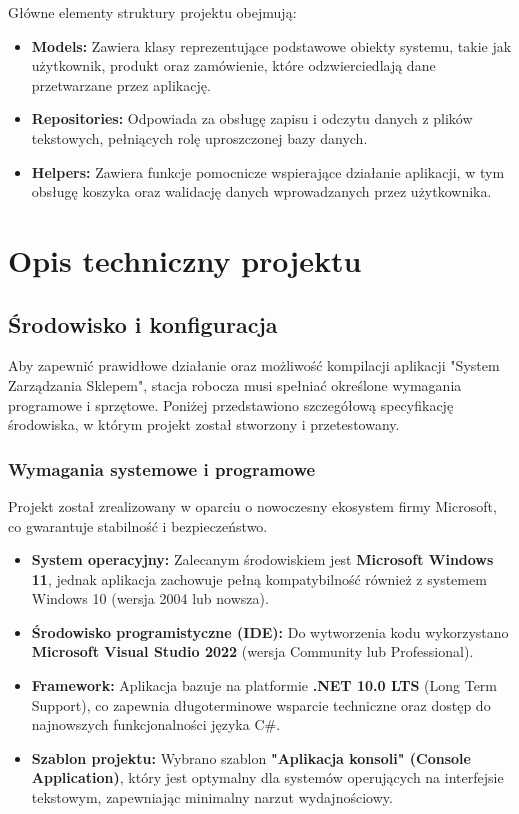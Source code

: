 \documentclass[a4paper,12pt]{report}
\begin{document}
Główne elementy struktury projektu obejmują:
\begin{itemize}
    \item \textbf{Models:} Zawiera klasy reprezentujące podstawowe obiekty systemu, takie jak użytkownik, produkt oraz zamówienie, które odzwierciedlają dane przetwarzane przez aplikację.
    \item \textbf{Repositories:} Odpowiada za obsługę zapisu i odczytu danych z plików tekstowych, pełniących rolę uproszczonej bazy danych.
    \item \textbf{Helpers:} Zawiera funkcje pomocnicze wspierające działanie aplikacji, w tym obsługę koszyka oraz walidację danych wprowadzanych przez użytkownika.
\end{itemize}

\chapter{Opis techniczny projektu}

\section{Środowisko i konfiguracja}
Aby zapewnić prawidłowe działanie oraz możliwość kompilacji aplikacji "System Zarządzania Sklepem", stacja robocza musi spełniać określone wymagania programowe i sprzętowe. Poniżej przedstawiono szczegółową specyfikację środowiska, w którym projekt został stworzony i przetestowany.

\subsection{Wymagania systemowe i programowe}
Projekt został zrealizowany w oparciu o nowoczesny ekosystem firmy Microsoft, co gwarantuje stabilność i bezpieczeństwo.
\begin{itemize}
    \item \textbf{System operacyjny:} Zalecanym środowiskiem jest \textbf{Microsoft Windows 11}, jednak aplikacja zachowuje pełną kompatybilność również z systemem Windows 10 (wersja 2004 lub nowsza).
    \item \textbf{Środowisko programistyczne (IDE):} Do wytworzenia kodu wykorzystano \textbf{Microsoft Visual Studio 2022} (wersja Community lub Professional).
    \item \textbf{Framework:} Aplikacja bazuje na platformie \textbf{.NET 10.0 LTS} (Long Term Support), co zapewnia długoterminowe wsparcie techniczne oraz dostęp do najnowszych funkcjonalności języka C\#.
    \item \textbf{Szablon projektu:} Wybrano szablon \textbf{"Aplikacja konsoli" (Console Application)}, który jest optymalny dla systemów operujących na interfejsie tekstowym, zapewniając minimalny narzut wydajnościowy.
\end{itemize}
\end{document}
